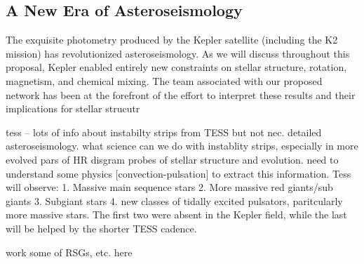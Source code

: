 {\color{blue}
\subsection{A New Era of Asteroseismology}

The exquisite photometry produced by the Kepler satellite (including the K2 mission) has revolutionized asteroseismology.   As we will discuss throughout this proposal, Kepler enabled entirely new constraints on stellar structure, rotation, magnetism, and chemical mixing.   The team associated with our proposed network has been at the forefront of the effort to interpret these results and their implications for stellar strucutr

tess -- lots of info about instabilty strips from TESS but not nec. detailed asteroseismology.  what science can we do with instablity strips, especially in more evolved pars of HR disgram  probes of stellar structure and evolution.   need to understand some physics [convection-pulsation] to extract this information.   Tess will observe: 1. Massive main sequence stars 2. More massive red giants/sub giants 3. Subgiant stars 4.  new classes of tidally excited pulsators, paritcularly more massive stars.   The first two were absent in the Kepler field, while the last will be helped by the shorter TESS cadence.

work some of RSGs, etc. here




}